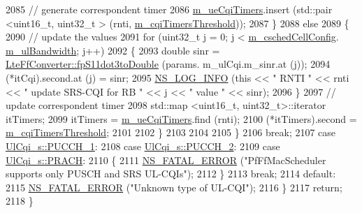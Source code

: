 \begin{DoxyCode}
2085             \textcolor{comment}{// generate correspondent timer}
2086             \hyperlink{classns3_1_1PfFfMacScheduler_abe22b494875155dfe6a503734ad4bbad}{m\_ueCqiTimers}.insert (std::pair <uint16\_t, uint32\_t > (rnti, 
      \hyperlink{classns3_1_1PfFfMacScheduler_ad2377e8bcc02252e2f0d3ca0fc2895b9}{m\_cqiTimersThreshold}));
2087           \}
2088         \textcolor{keywordflow}{else}
2089           \{
2090             \textcolor{comment}{// update the values}
2091             \textcolor{keywordflow}{for} (uint32\_t j = 0; j < \hyperlink{classns3_1_1PfFfMacScheduler_a0be1f7a1e78824b031e48208b8af1048}{m\_cschedCellConfig}.
      \hyperlink{structns3_1_1FfMacCschedSapProvider_1_1CschedCellConfigReqParameters_a5ab5b102878e6e7e7727a14af4a64d2f}{m\_ulBandwidth}; j++)
2092               \{
2093                 \textcolor{keywordtype}{double} sinr = \hyperlink{classns3_1_1LteFfConverter_aa5d8c2a8f988dbd63da91818c18666eb}{LteFfConverter::fpS11dot3toDouble} (params.
      m\_ulCqi.m\_sinr.at (j));
2094                 (*itCqi).second.at (j) = sinr;
2095                 \hyperlink{group__logging_gafbd73ee2cf9f26b319f49086d8e860fb}{NS\_LOG\_INFO} (\textcolor{keyword}{this} << \textcolor{stringliteral}{" RNTI "} << rnti << \textcolor{stringliteral}{" update SRS-CQI for RB  "} << j << \textcolor{stringliteral}{"
       value "} << sinr);
2096               \}
2097             \textcolor{comment}{// update correspondent timer}
2098             std::map <uint16\_t, uint32\_t>::iterator itTimers;
2099             itTimers = \hyperlink{classns3_1_1PfFfMacScheduler_abe22b494875155dfe6a503734ad4bbad}{m\_ueCqiTimers}.find (rnti);
2100             (*itTimers).second = \hyperlink{classns3_1_1PfFfMacScheduler_ad2377e8bcc02252e2f0d3ca0fc2895b9}{m\_cqiTimersThreshold};
2101 
2102           \}
2103 
2104 
2105       \}
2106       \textcolor{keywordflow}{break};
2107     \textcolor{keywordflow}{case} \hyperlink{structns3_1_1UlCqi__s_aece9e5ebea42eb9ff1744c72c8459b57a05ca6554bc6fcd96a0a51fbaa8e794c7}{UlCqi\_s::PUCCH\_1}:
2108     \textcolor{keywordflow}{case} \hyperlink{structns3_1_1UlCqi__s_aece9e5ebea42eb9ff1744c72c8459b57a35664b4bda6f1cd6acfe9edc84c7571d}{UlCqi\_s::PUCCH\_2}:
2109     \textcolor{keywordflow}{case} \hyperlink{structns3_1_1UlCqi__s_aece9e5ebea42eb9ff1744c72c8459b57af93f36792cb1eed08f6119e4abfe58e8}{UlCqi\_s::PRACH}:
2110       \{
2111         \hyperlink{group__fatal_ga5131d5e3f75d7d4cbfd706ac456fdc85}{NS\_FATAL\_ERROR} (\textcolor{stringliteral}{"PfFfMacScheduler supports only PUSCH and SRS UL-CQIs"});
2112       \}
2113       \textcolor{keywordflow}{break};
2114     \textcolor{keywordflow}{default}:
2115       \hyperlink{group__fatal_ga5131d5e3f75d7d4cbfd706ac456fdc85}{NS\_FATAL\_ERROR} (\textcolor{stringliteral}{"Unknown type of UL-CQI"});
2116     \}
2117   \textcolor{keywordflow}{return};
2118 \}
\end{DoxyCode}


